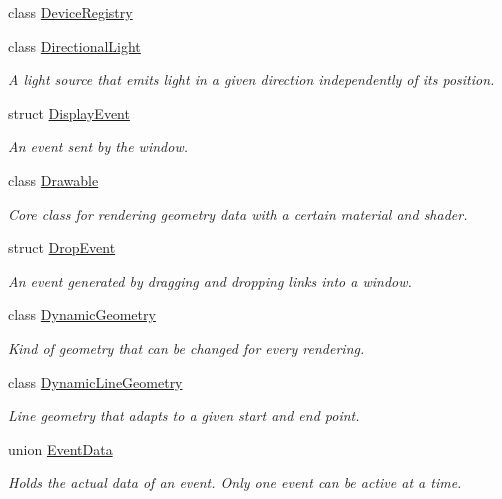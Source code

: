 \begin{DoxyCompactItemize}
class \mbox{\hyperlink{classec_1_1_device_registry}{Device\+Registry}}
\item 
class \mbox{\hyperlink{classec_1_1_directional_light}{Directional\+Light}}
\begin{DoxyCompactList}\small\item\em A light source that emits light in a given direction independently of its position. \end{DoxyCompactList}\item 
struct \mbox{\hyperlink{structec_1_1_display_event}{Display\+Event}}
\begin{DoxyCompactList}\small\item\em An event sent by the window. \end{DoxyCompactList}\item 
class \mbox{\hyperlink{classec_1_1_drawable}{Drawable}}
\begin{DoxyCompactList}\small\item\em Core class for rendering geometry data with a certain material and shader. \end{DoxyCompactList}\item 
struct \mbox{\hyperlink{structec_1_1_drop_event}{Drop\+Event}}
\begin{DoxyCompactList}\small\item\em An event generated by dragging and dropping links into a window. \end{DoxyCompactList}\item 
class \mbox{\hyperlink{classec_1_1_dynamic_geometry}{Dynamic\+Geometry}}
\begin{DoxyCompactList}\small\item\em Kind of geometry that can be changed for every rendering. \end{DoxyCompactList}\item 
class \mbox{\hyperlink{classec_1_1_dynamic_line_geometry}{Dynamic\+Line\+Geometry}}
\begin{DoxyCompactList}\small\item\em Line geometry that adapts to a given start and end point. \end{DoxyCompactList}\item 
union \mbox{\hyperlink{unionec_1_1_event_data}{Event\+Data}}
\begin{DoxyCompactList}\small\item\em Holds the actual data of an event. Only one event can be active at a time. \end{DoxyCompactList}\item 

\end{DoxyCompactItemize}
